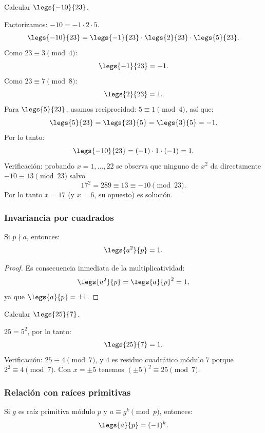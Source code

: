 \begin{ejemplo}
Calcular $\legs{-10}{23}$.
\end{ejemplo}
\begin{solucion}
Factorizamos: $-10 = -1 \cdot 2 \cdot 5$.
\[
\legs{-10}{23} = \legs{-1}{23} \cdot \legs{2}{23} \cdot \legs{5}{23}.
\]
Como $23 \equiv 3 \pmod{4}$:
\[
\legs{-1}{23} = -1.
\]
Como $23 \equiv 7 \pmod{8}$:
\[
\legs{2}{23} = 1.
\]
Para $\legs{5}{23}$, usamos reciprocidad: $5 \equiv 1 \pmod{4}$, así que:
\[
\legs{5}{23} = \legs{23}{5} = \legs{3}{5} = -1.
\]
Por lo tanto:
\[
\legs{-10}{23} = (-1) \cdot 1 \cdot (-1) = 1.
\]
Verificación: probando $x=1,\dots,22$ se observa que ninguno de $x^2$ da directamente $-10 \equiv 13 \pmod{23}$ salvo
\[
17^2 = 289 \equiv 13 \equiv -10 \pmod{23}.
\]
Por lo tanto $x=17$ (y $x=6$, su opuesto) es solución.
\end{solucion}

\subsubsection{Invariancia por cuadrados}

\begin{corolario}
Si $p \nmid a$, entonces:
\[
\legs{a^2}{p} = 1.
\]
\end{corolario}

\begin{proof}
Es consecuencia inmediata de la multiplicatividad:
\[
\legs{a^2}{p} = \legs{a}{p}^2 = 1,
\]
ya que $\legs{a}{p} = \pm 1$.
\end{proof}

\begin{ejemplo}
Calcular $\legs{25}{7}$.
\end{ejemplo}
\begin{solucion}
$25 = 5^2$, por lo tanto:
\[
\legs{25}{7} = 1.
\]
Verificación: $25 \equiv 4 \pmod{7}$, y $4$ es residuo cuadrático módulo $7$ porque $2^2 \equiv 4 \pmod 7$. Con $x = \pm 5$ tenemos $(\pm 5)^2 \equiv 25 \pmod{7}$.
\end{solucion}

\subsubsection{Relación con raíces primitivas}

\begin{teorema}
Si $g$ es raíz primitiva módulo $p$ y $a \equiv g^k \pmod{p}$, entonces:
\[
\legs{a}{p} = (-1)^k.
\]
\end{teorema}

